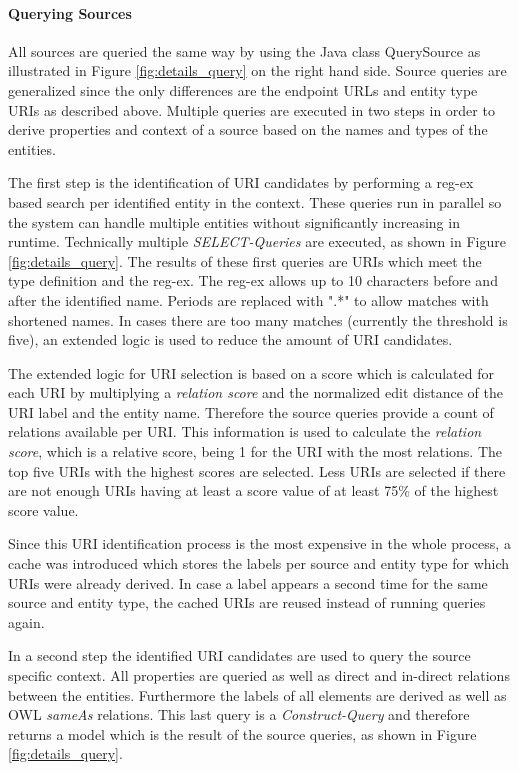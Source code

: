 \paragraph{Querying Sources}
All sources are queried the same way by using the Java class QuerySource as illustrated in Figure \ref{fig:details_query} on the right hand side. Source queries are generalized since the only differences are the endpoint URLs and entity type URIs as described above. Multiple queries are executed in two steps in order to derive properties and context of a source based on the names and types of the entities.

The first step is the identification of URI candidates by performing a reg-ex based search per identified entity in the context. These queries run in parallel so the system can handle multiple entities without significantly increasing in runtime. Technically multiple \textit{SELECT-Queries} are executed, as shown in Figure \ref{fig:details_query}. The results of these first queries are URIs which meet the type definition and the reg-ex. The reg-ex allows up to 10 characters before and after the identified name. Periods are replaced with ".*" to allow matches with shortened names. In cases there are too many matches (currently the threshold is five), an extended logic is used to reduce the amount of URI candidates. 

The extended logic for URI selection is based on a score which is calculated for each URI by multiplying a \textit{relation score} and the normalized edit distance of the URI label and the entity name. Therefore the source queries provide a count of relations available per URI. This information is used to calculate the \textit{relation score}, which is a relative score, being 1 for the URI with the most relations. The top five URIs with the highest scores are selected. Less URIs are selected if there are not enough URIs having at least a score value of at least 75\% of the highest score value.

Since this URI identification process is the most expensive in the whole process, a cache was introduced which stores the labels per source and entity type for which URIs were already derived. In case a label appears a second time for the same source and entity type, the cached URIs are reused instead of running queries again.

In a second step the identified URI candidates are used to query the source specific context. All properties are queried as well as direct and in-direct relations between the entities. Furthermore the labels of all elements are derived as well as OWL \textit{sameAs} relations. 
This last query is a \textit{Construct-Query} and therefore returns a model which is the result of the source queries, as shown in Figure \ref{fig:details_query}. 

